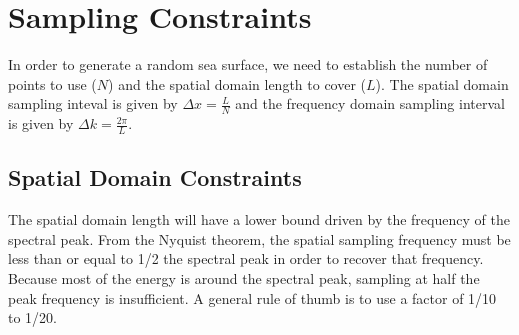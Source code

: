 \section{Sampling Constraints}\label{os_label:1d_sampling_constraints}
In order to generate a random sea surface, we need to establish the number of points to use ($N$) and the spatial domain length to cover ($L$). The spatial domain sampling inteval is given by $\Delta x = \frac{L}{N}$ and the frequency domain sampling interval is given by $\Delta k = \frac{2\pi}{L}$. 

\subsection{Spatial Domain Constraints}
The spatial domain length will have a lower bound driven by the frequency of the spectral peak. From the Nyquist theorem, the spatial sampling frequency must be less than or equal to 1/2 the spectral peak in order to recover that frequency. Because most of the energy is around the spectral peak, sampling at half the peak frequency is insufficient. A general rule of thumb is to use a factor of 1/10 to 1/20.

